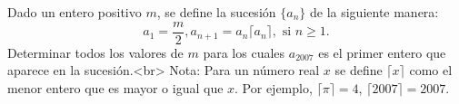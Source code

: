 Dado un entero positivo $m$, se define la sucesión $\{ a_n \}$ de la siguiente manera:
\[ a_1 = \frac{m}{2}, a_{n+1} = a_n \lceil a_n \rceil, \text{ si } n \geq 1. \]
Determinar todos los valores de $m$ para los cuales $a_{2007}$ es el primer entero que aparece en la sucesión.<br>
Nota: Para un número real $x$ se define $\lceil x \rceil$ como el menor entero que es mayor o igual que $x$. Por ejemplo, $\lceil \pi \rceil = 4$, $\lceil 2007 \rceil = 2007$.
